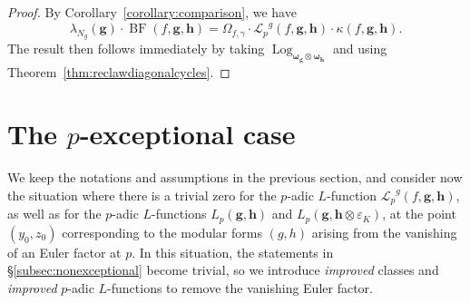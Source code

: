 \documentclass[a4paper,11pt]{amsart}
\theoremstyle{plain}
\theoremstyle{definition}
\theoremstyle{remark}
\newtheorem{remarkwr}[theorem]{Remark}
\newenvironment{remark}{\begin{remarkwr}\begin{upshape}}{\end{upshape}\end{remarkwr}}
\DeclareMathOperator{\BF}{BF}
\DeclareMathOperator{\Log}{Log}
\newcommand{\Lp}{{\mathscr{L}_p}}
\newcommand{\hg}{{\mathbf{g}}}
\newcommand{\hh}{{\mathbf h}}
\numberwithin{equation}{section}
\begin{document}
\begin{proof}
By Corollary~\ref{corollary:comparison}, we have
\[
\lambda_{N_g}(\hg)\cdot\BF(f,\hg,\hh)=\Omega_{f,\gamma}\cdot \Lp^g(f,\hg,\hh) \cdot \kappa(f,\hg,\hh).
\]
The result then follows immediately by taking $\Log_{\bm{\omega}_{\hg} \otimes \bm{\omega}_{\hh}}$ and using Theorem~\ref{thm:reclawdiagonalcycles}. 
\end{proof}

\section{The $p$-exceptional case}\label{sec:expectional}

We keep the notations and assumptions in the previous section, and consider now the situation where there is a trivial zero for the $p$-adic $L$-function $\Lp^g(f,\hg,\hh)$, as well as for the $p$-adic $L$-functions $L_p(\hg,\hh)$ and $L_p(\hg,\hh\otimes\varepsilon_K)$, at the point $(y_0,z_0)$ corresponding to the modular forms $(g,h)$ arising from the vanishing of an Euler factor at $p$. In this situation, the statements in \S\ref{subsec:nonexceptional} become trivial, so we introduce \textit{improved} classes and \textit{improved} $p$-adic $L$-functions to remove the vanishing Euler factor. %
\end{document}
